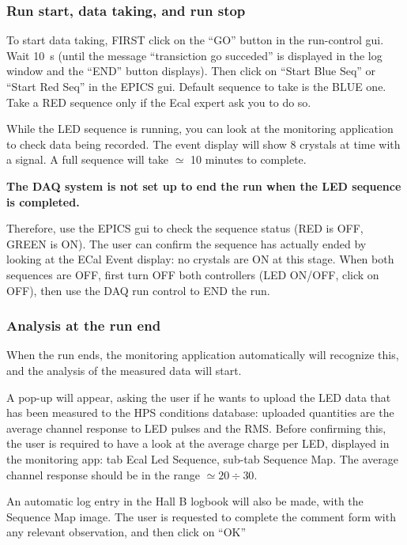 \documentclass[12pt]{article}
\begin{document}
\subsubsection{Run start, data taking, and run stop}
To start data taking, FIRST click on the ``GO'' button in the run-control gui. Wait 10~s (until the message ``transiction go succeded'' is displayed in the log window and the ``END'' button displays). Then click on ``Start Blue Seq'' or ``Start Red Seq'' in the EPICS gui. Default sequence to take is the BLUE one. Take a RED sequence only if the Ecal expert ask you to do so.

While the LED sequence is running, you can look at the monitoring application to check data being recorded. The event display will show 8 crystals at time with a signal. A full sequence will take $\simeq$ 10 minutes to complete.

{\bf  The DAQ system is not set up to end the run when the LED sequence is completed.} 

Therefore, use the EPICS gui to check the sequence status (RED is OFF, GREEN is ON). The user can confirm the sequence has actually ended by looking at the ECal Event display: no crystals are ON at this stage.
When both sequences are OFF, first turn OFF both controllers (LED ON/OFF, click on OFF), then use the DAQ run control to END the run.



\subsubsection{Analysis at the run end}

When the run ends, the monitoring application automatically will recognize this, and the analysis of the measured data will start. 

A pop-up will appear, asking the user if he wants to upload the LED data that has been measured to the HPS conditions database: uploaded quantities are the average channel response to LED pulses and the RMS. Before confirming this, the user is required to have a look at the average charge per LED, displayed in the monitoring app: tab Ecal Led Sequence, sub-tab Sequence Map. The average channel response should be in the range $\simeq 20 \div 30$. 

An automatic log entry in the Hall B logbook will also be made, with the Sequence Map image. The user is requested to complete the comment form with any relevant observation, and then click on ``OK''
\end{document}
